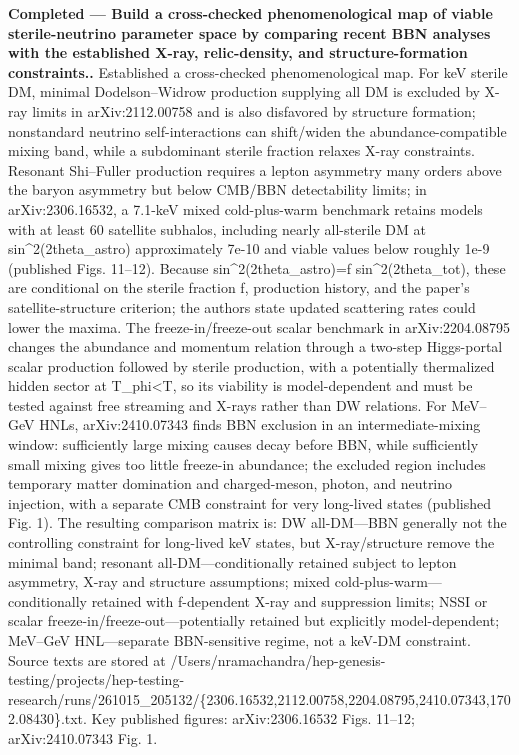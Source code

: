 \documentclass[11pt,a4paper]{article}
\begin{document}
\textbf{Completed --- Build a cross-checked phenomenological map of viable sterile-neutrino parameter space by comparing recent BBN analyses with the established X-ray, relic-density, and structure-formation constraints..} Established a cross-checked phenomenological map. For keV sterile DM, minimal Dodelson--Widrow production supplying all DM is excluded by X-ray limits in arXiv:2112.00758 and is also disfavored by structure formation; nonstandard neutrino self-interactions can shift/widen the abundance-compatible mixing band, while a subdominant sterile fraction relaxes X-ray constraints. Resonant Shi--Fuller production requires a lepton asymmetry many orders above the baryon asymmetry but below CMB/BBN detectability limits; in arXiv:2306.16532, a 7.1-keV mixed cold-plus-warm benchmark retains models with at least 60 satellite subhalos, including nearly all-sterile DM at sin\textasciicircum{}2(2theta\_astro) approximately 7e-10 and viable values below roughly 1e-9 (published Figs. 11--12). Because sin\textasciicircum{}2(2theta\_astro)=f sin\textasciicircum{}2(2theta\_tot), these are conditional on the sterile fraction f, production history, and the paper's satellite-structure criterion; the authors state updated scattering rates could lower the maxima. The freeze-in/freeze-out scalar benchmark in arXiv:2204.08795 changes the abundance and momentum relation through a two-step Higgs-portal scalar production followed by sterile production, with a potentially thermalized hidden sector at T\_phi\textless{}T, so its viability is model-dependent and must be tested against free streaming and X-rays rather than DW relations. For MeV--GeV HNLs, arXiv:2410.07343 finds BBN exclusion in an intermediate-mixing window: sufficiently large mixing causes decay before BBN, while sufficiently small mixing gives too little freeze-in abundance; the excluded region includes temporary matter domination and charged-meson, photon, and neutrino injection, with a separate CMB constraint for very long-lived states (published Fig. 1). The resulting comparison matrix is: DW all-DM---BBN generally not the controlling constraint for long-lived keV states, but X-ray/structure remove the minimal band; resonant all-DM---conditionally retained subject to lepton asymmetry, X-ray and structure assumptions; mixed cold-plus-warm---conditionally retained with f-dependent X-ray and suppression limits; NSSI or scalar freeze-in/freeze-out---potentially retained but explicitly model-dependent; MeV--GeV HNL---separate BBN-sensitive regime, not a keV-DM constraint. Source texts are stored at /Users/nramachandra/hep-genesis-testing/projects/hep-testing-research/runs/261015\_205132/\{2306.16532,2112.00758,2204.08795,2410.07343,1702.08430\}.txt. Key published figures: arXiv:2306.16532 Figs. 11--12; arXiv:2410.07343 Fig. 1.
\end{document}
